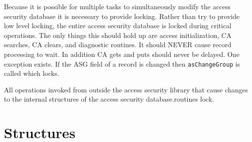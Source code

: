Because it is possible for multiple tasks to simultaneously modify the access security database it is necessary to provide 
locking. Rather than try to provide low level locking, the entire access security database is locked during critical 
operations. The only things this should hold up are access initialization, CA searches, CA clears, and diagnostic routines. 
It should NEVER cause record processing to wait. In addition CA gets and puts should never be delayed. One exception 
exists. If the ASG field of a record is changed then \verb|asChangeGroup| is called which locks.

All operations invoked from outside the access security library that cause changes to the internal structures of the access 
security database.routines lock.

\section{Structures}










